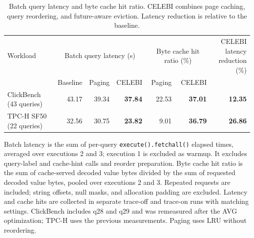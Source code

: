 \begin{table}[t]
  \centering
  \caption{Batch query latency and byte cache hit ratio. CELEBI combines page
    caching, query reordering, and future-aware eviction. Latency reduction is
    relative to the baseline.}
  \label{tab:batch-latency-cache-hits}
  \small
  \setlength{\tabcolsep}{6pt}
  \begin{tabular}{@{}lrrrrrr@{}}
    \toprule
    Workload & \multicolumn{3}{c}{Batch query latency (s)}
      & \multicolumn{2}{c}{Byte cache hit ratio (\%)}
      & \shortstack{CELEBI latency\\reduction (\%)} \\
    \cmidrule(lr){2-4}\cmidrule(lr){5-6}
      & Baseline & Paging & CELEBI & Paging & CELEBI & \\
    \midrule
    ClickBench (43 queries)
      & 43.17 & 39.34 & \textbf{37.84}
      & 22.53 & \textbf{37.01} & \textbf{12.35} \\
    TPC-H SF50 (22 queries)
      & 32.56 & 30.75 & \textbf{23.82}
      & 9.01 & \textbf{36.79} & \textbf{26.86} \\
    \bottomrule
  \end{tabular}
  \par\vspace{4pt}
  \begin{minipage}{\textwidth}
    \footnotesize
    Batch latency is the sum of per-query \texttt{execute().fetchall()} elapsed
    times, averaged over executions 2 and 3; execution 1 is excluded as warmup.
    It excludes query-label and cache-hint calls and reorder preparation.
    Byte cache hit ratio is the sum of cache-served decoded value bytes divided
    by the sum of requested decoded value bytes, pooled over executions 2 and 3.
    Repeated requests are included; string offsets, null masks, and allocation
    padding are excluded. Latency and cache hits are collected in separate
    trace-off and trace-on runs with matching settings.
    ClickBench includes q28 and q29 and was remeasured after the AVG optimization;
    TPC-H uses the previous measurements. Paging uses LRU without reordering.
  \end{minipage}
\end{table}
